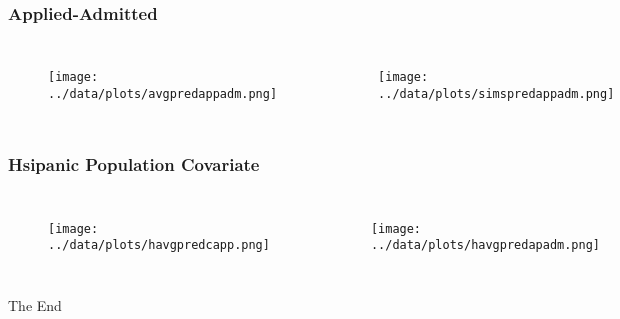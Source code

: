 \documentclass{beamer}
\begin{document}

\begin{frame}
\frametitle{Applied-Admitted}
\begin{columns}[c] %

\begin{figure}
\texttt{[image: ../data/plots/avgpredappadm.png]}
\end{figure}

\begin{figure}
\texttt{[image: ../data/plots/simspredappadm.png]}
\end{figure}

\end{columns}
\end{frame}


\begin{frame}
\frametitle{Hsipanic Population Covariate}
\begin{columns}[c] %

\begin{figure}
\texttt{[image: ../data/plots/havgpredcapp.png]}
\end{figure}

\begin{figure}
\texttt{[image: ../data/plots/havgpredapadm.png]}
\end{figure}

\end{columns}
\end{frame}

\begin{frame}
\Huge{\centerline{The End}}
\end{frame}

\end{document}
